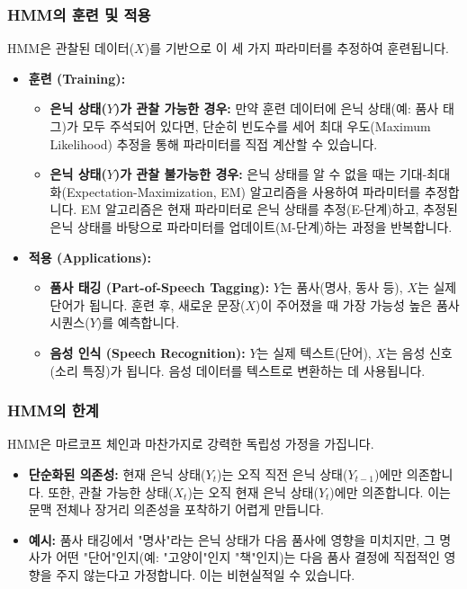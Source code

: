 \documentclass[11pt,a4paper]{article}
\begin{document}
\subsubsection{HMM의 훈련 및 적용}
HMM은 관찰된 데이터($X$)를 기반으로 이 세 가지 파라미터를 추정하여 훈련됩니다.

\begin{itemize}
    \item \textbf{훈련 (Training):}
    \begin{itemize}
        \item \textbf{은닉 상태($Y$)가 관찰 가능한 경우:} 만약 훈련 데이터에 은닉 상태(예: 품사 태그)가 모두 주석되어 있다면, 단순히 빈도수를 세어 최대 우도(Maximum Likelihood) 추정을 통해 파라미터를 직접 계산할 수 있습니다.
        \item \textbf{은닉 상태($Y$)가 관찰 불가능한 경우:} 은닉 상태를 알 수 없을 때는 기대-최대화(Expectation-Maximization, EM) 알고리즘을 사용하여 파라미터를 추정합니다. EM 알고리즘은 현재 파라미터로 은닉 상태를 추정(E-단계)하고, 추정된 은닉 상태를 바탕으로 파라미터를 업데이트(M-단계)하는 과정을 반복합니다.
    \end{itemize}
    \item \textbf{적용 (Applications):}
    \begin{itemize}
        \item \textbf{품사 태깅 (Part-of-Speech Tagging):} $Y$는 품사(명사, 동사 등), $X$는 실제 단어가 됩니다. 훈련 후, 새로운 문장($X$)이 주어졌을 때 가장 가능성 높은 품사 시퀀스($Y$)를 예측합니다.
        \item \textbf{음성 인식 (Speech Recognition):} $Y$는 실제 텍스트(단어), $X$는 음성 신호(소리 특징)가 됩니다. 음성 데이터를 텍스트로 변환하는 데 사용됩니다.
    \end{itemize}
\end{itemize}

\subsubsection{HMM의 한계}
HMM은 마르코프 체인과 마찬가지로 강력한 독립성 가정을 가집니다.
\begin{itemize}
    \item \textbf{단순화된 의존성:} 현재 은닉 상태($Y_t$)는 오직 직전 은닉 상태($Y_{t-1}$)에만 의존합니다. 또한, 관찰 가능한 상태($X_t$)는 오직 현재 은닉 상태($Y_t$)에만 의존합니다. 이는 문맥 전체나 장거리 의존성을 포착하기 어렵게 만듭니다.
    \item \textbf{예시:} 품사 태깅에서 "명사"라는 은닉 상태가 다음 품사에 영향을 미치지만, 그 명사가 어떤 "단어"인지(예: "고양이"인지 "책"인지)는 다음 품사 결정에 직접적인 영향을 주지 않는다고 가정합니다. 이는 비현실적일 수 있습니다.
\end{itemize}
\end{document}
